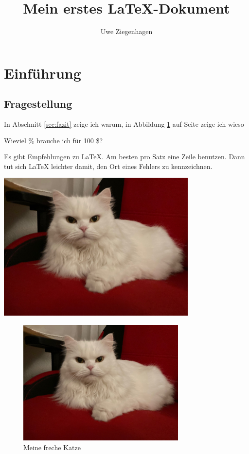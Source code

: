 \documentclass[12pt,parskip=half]{scrartcl}
\author{Uwe Ziegenhagen}
\title{Mein erstes \LaTeX-Dokument}
\begin{document}
\maketitle

\tableofcontents %

\listoffigures

\listoftodos

\clearpage

\section{Einführung}
\subsection{Fragestellung} 

In Abschnitt \ref{sec:fazit} zeige ich warum, in Abbildung \ref{fig:katze} auf Seite \pageref{fig:katze} zeige ich wieso

Wieviel \% brauche ich für 100 \$? %

Es gibt Empfehlungen zu LaTeX.
Am besten pro Satz eine Zeile benutzen.
Dann tut sich LaTeX leichter damit, den Ort eines Fehlers zu kennzeichnen.

\includegraphics[width=0.75\textwidth]{Bilder/Katze}


\begin{figure}
\centering
\includegraphics[width=0.75\textwidth]{Bilder/Katze}
\caption{Meine freche Katze}\label{fig:katze}
\end{figure}
\end{document}
